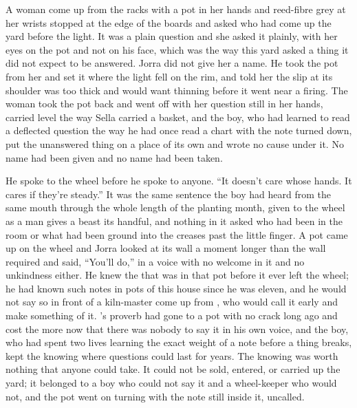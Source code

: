 A woman come up from the racks with a pot in her hands and reed-fibre grey at her wrists stopped at the edge of the boards and asked who had come up the yard before the light. It was a plain question and she asked it plainly, with her eyes on the pot and not on his face, which was the way this yard asked a thing it did not expect to be answered. Jorra did not give her a name. He took the pot from her and set it where the light fell on the rim, and told her the slip at its shoulder was too thick and would want thinning before it went near a firing. The woman took the pot back and went off with her question still in her hands, carried level the way Sella carried a basket, and the boy, who had learned to read a deflected question the way he had once read a chart with the note turned down, put the unanswered thing on a place of its own and wrote no cause under it. No name had been given and no name had been taken.

He spoke to the wheel before he spoke to anyone. “It doesn't care whose hands. It cares if they're steady.” It was the same sentence the boy had heard from the same mouth through the whole length of the planting month, given to the wheel as a man gives a beast its handful, and nothing in it asked who had been in the room or what had been ground into the creases past the little finger. A pot came up on the wheel and Jorra looked at its wall a moment longer than the wall required and said, “You'll do,” in a voice with no welcome in it and no unkindness either. He knew the  that was in that pot before it ever left the wheel; he had known such notes in pots of this house since he was eleven, and he would not say so in front of a kiln-master come up from , who would call it early and make something of it. 's proverb had gone to a pot with no crack long ago and cost the more now that there was nobody to say it in his own voice, and the boy, who had spent two lives learning the exact weight of a note before a thing breaks, kept the knowing where questions could last for years. The knowing was worth nothing that anyone could take. It could not be sold, entered, or carried up the yard; it belonged to a boy who could not say it and a wheel-keeper who would not, and the pot went on turning with the note still inside it, uncalled.

